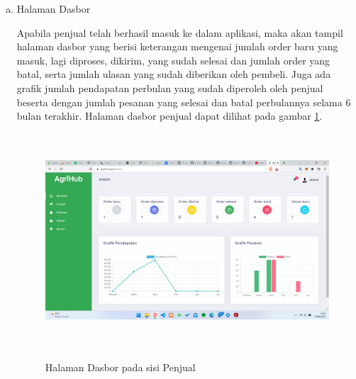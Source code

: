 \begin{enumerate}
\begin{enumerate}[a.]
		\item Halaman Dasbor
		\par Apabila penjual telah berhasil masuk ke dalam aplikasi, maka akan tampil halaman dasbor yang berisi keterangan mengenai jumlah order baru yang masuk, lagi diproses, dikirim, yang sudah selesai dan jumlah order yang batal, serta jumlah ulasan yang sudah diberikan oleh pembeli. Juga ada grafik jumlah pendapatan perbulan yang sudah diperoleh oleh penjual beserta dengan jumlah pesanan yang selesai dan batal perbulannya selama 6 bulan terakhir. Halaman dasbor penjual dapat dilihat pada gambar \ref*{dashboard_penjual}.
		\begin{figure}[H]
			\centering
			{\includegraphics [width = 13.5cm, height= 8cm]{gambar/penjual/dashboard_penjual}}
			\caption{Halaman Dasbor pada sisi Penjual}
			\label{dashboard_penjual}
		\end{figure}


\end{enumerate}
\end{enumerate}

